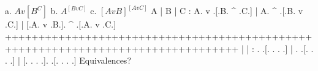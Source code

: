\list
a. $ A v [B ^ C] $
b. $ A ^ [B v C] $
c. $ [A v B] ^ [A v C] $
\endlist
        \answer
        \truthtable
         A | B | C : A. v .[.B. ^ .C.] | A. ^ .[.B. v .C.] | [.A. v .B.]. ^ .[.A. v .C.]
        +++++++++++++++++++++++++++++++++++++++++++++++++++++++++++++++++++++++++++++++++
           |   |   :  .   .[. .   . .] |  .   .[. .   . .] | [. .   . .].   .[. .   . .]
        \endtruthtable
        Equivalences?
        \endanswer

\endproblems
\bye
